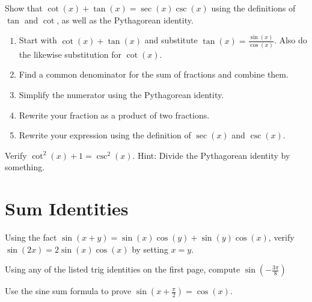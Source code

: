 \documentclass[12pt, a4paper]{article}
\begin{document}
\begin{ex}
  Show that \(\cot(x)+\tan(x) = \sec(x)\csc(x)\) using the definitions
  of \(\tan\) and \(\cot\), as well as the Pythagorean identity.
  \begin{enumerate}
  \item Start with \(\cot(x) + \tan(x)\) and substitute \(\tan(x) =
    \frac{\sin(x)}{\cos(x)}\). Also do the 
    likewise substitution for \(\cot(x)\).
    \vspace{1in}
  \item Find a common denominator for the sum of fractions and combine
    them.
    \vspace{1in}
  \item Simplify the numerator using the Pythagorean identity.
    \vspace{1in}
  \item Rewrite your fraction as a product of two fractions.
    \vspace{1in}
  \item Rewrite your expression using the definition of \(\sec(x)\)
    and \(\csc(x)\).
  \end{enumerate}
\end{ex}
\vspace{-1in}
\begin{ex}
  Verify \(\cot^2(x)+1 = \csc^2(x)\). Hint: Divide the Pythagorean
  identity by something.
\end{ex}
\section{Sum Identities}
\begin{ex}
  Using the fact \(\sin(x+y) = \sin(x)\cos(y)+\sin(y)\cos(x)\), verify
  \(\sin(2x) = 2 \sin(x)\cos(x)\) by setting \(x = y\).
\end{ex}
\begin{ex}
  Using any of the listed trig identities on the first page, compute
  \(\sin\left( -\frac{3 \pi}{8} \right)\)
\end{ex}
\begin{ex}
  Use the sine sum formula to prove \(\sin\left(x+\frac{\pi}{2}\right) = \cos(x)\).
\end{ex}
\end{document}
